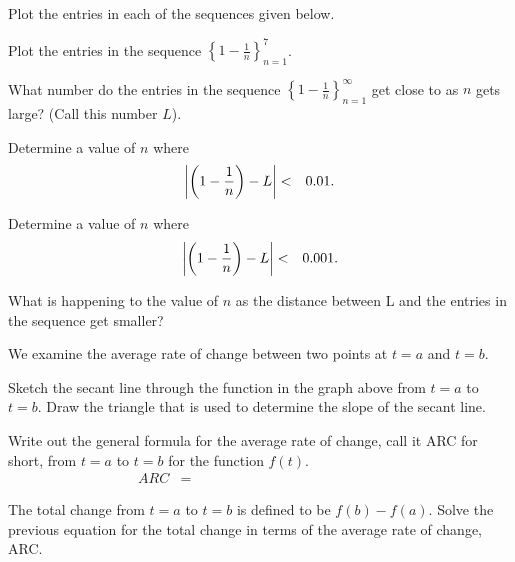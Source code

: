 \begin{problem}
\item Plot the entries in each of the sequences given below.
  \begin{subproblem}
    \item Plot the entries in the sequence $\left\{ 1-\frac{1}{n}\right\}_{n=1}^7$.

      \scalebox{0.7}{}

    \item What number do the entries in the sequence
      $\left\{ 1-\frac{1}{n}\right\}_{n=1}^\infty$ get close to as $n$
      gets large?  (Call this number $L$).

      \clearpage

    \item Determine a value of $n$ where 
      \begin{eqnarray*}
        \left| \left( 1-\frac{1}{n} \right) - L \right| & < & 0.01.
      \end{eqnarray*}

      \vfill

    \item Determine a value of $n$ where 
      \begin{eqnarray*}
        \left| \left( 1-\frac{1}{n}\right) - L \right| & < & 0.001.
      \end{eqnarray*}

      \vfill

    \item What is happening to the value of $n$ as the distance
      between L and the entries in the sequence get smaller?

      \vspace{3em}

  \end{subproblem}

  \clearpage

\item We examine the average rate of change between two points at
  $t=a$ and $t=b$.

  \scalebox{0.7}{}

  \begin{subproblem}
  \item Sketch the secant line through the function in the graph above
    from $t=a$ to $t=b$. Draw the triangle that is used to determine
    the slope of the secant line.
  \item Write out the general formula for the average rate of change,
    call it ARC for short, from $t=a$ to $t=b$ for the function
    $f(t)$.
    \begin{eqnarray*}
      ARC & = & ~~~~~~~~~~~~~~~~~~~~~~~~~~~~~~~~~~~~~~~~~~~~~~~~~~~~~~~~~~
    \end{eqnarray*}
    \vspace{2em}
  \item The total change from $t=a$ to $t=b$ is defined to be
    $f(b)-f(a)$. Solve the previous equation for the total change in
    terms of the average rate of change, ARC.
    \vfill
  \end{subproblem}


\end{problem}
